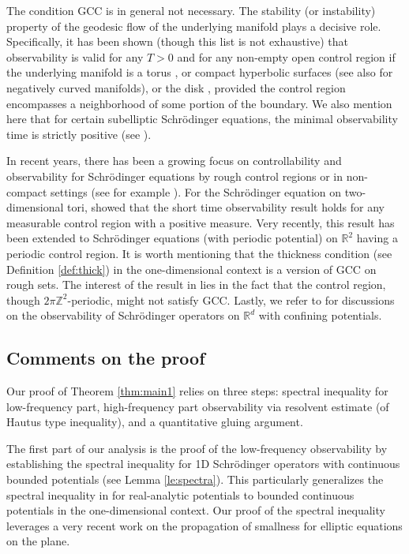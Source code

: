 \documentclass[a4paper,reqno]{amsart}
\theoremstyle{definition}
\numberwithin{equation}{section}
\newcommand{\R}{\mathbb{R}}
\def \R {{\mathbb{R} }}
\begin{document}
\smallskip
The condition GCC is in general not necessary. The stability (or instability) property of the geodesic flow of the underlying manifold plays a decisive role. Specifically, it has been shown (though this list is not exhaustive) that observability is valid for any \(T>0\) and for any non-empty open control region if the underlying manifold is a torus \cite{AM14,BBZ,BZ4,Ja}, or compact hyperbolic surfaces \cite{Ji} (see also \cite{AR} for negatively curved manifolds), or the disk \cite{ALM14}, provided the control region encompasses a neighborhood of some portion of the boundary. We also mention here that for certain subelliptic Schr\"odinger equations, the minimal observability time is strictly positive (see \cite{BuSun,FeLe}).

\smallskip
In recent years, there has been a growing focus on controllability and observability for Schr\"odinger equations by rough control regions or in non-compact settings (see for example \cite{BZ5,HWW,MLe,Pr,Taufer,WWZ}). 
For the Schr\"odinger equation on two-dimensional tori, \cite{BZ5} showed that the short time observability result holds for any measurable control region with a positive measure. Very recently, this result has been extended to Schr\"odinger equations (with periodic potential) on \(\R^2\) having a periodic control region. It is worth mentioning that the thickness condition (see Definition \ref{def:thick}) in the one-dimensional context is a version of GCC on rough sets. The interest of the result in \cite{MLe} lies in the fact that the control region, though \(2\pi \mathbb{Z}^2\)-periodic, might not satisfy  GCC. Lastly, we refer to \cite{HWW,Pr} for discussions on the observability of Schr\"odinger operators on $\R^{d}$ with confining potentials.

\subsection{Comments on the proof}

Our proof of Theorem \ref{thm:main1} relies on three steps:
spectral inequality for low-frequency part, high-frequency part observability via resolvent estimate (of Hautus type inequality), and a quantitative gluing argument. 

\smallskip
The first part of our analysis is the proof of the low-frequency observability by establishing the spectral inequality for 1D Schr\"odinger operators with continuous bounded potentials (see Lemma \ref{le:spectra}). This particularly generalizes the spectral inequality in \cite{LeM} for real-analytic potentials to bounded continuous potentials in the one-dimensional context. Our proof of the spectral inequality leverages a very recent work \cite{ZHU} on the propagation of smallness for elliptic equations on the plane.
\end{document}
